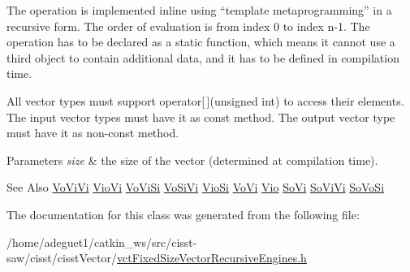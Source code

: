 The operation is implemented inline using ``template metaprogramming'' in a recursive form. The order of evaluation is from index 0 to index n-\/1. The operation has to be declared as a static function, which means it cannot use a third object to contain additional data, and it has to be defined in compilation time.

All vector types must support operator\mbox{[}$\,$\mbox{]}(unsigned int) to access their elements. The input vector types must have it as const method. The output vector type must have it as non-\/const method.


\begin{DoxyParams}{Parameters}
{\em size} & the size of the vector (determined at compilation time).\\
\hline
\end{DoxyParams}
\begin{DoxySeeAlso}{See Also}
\hyperlink{classvct_fixed_size_vector_recursive_engines_1_1_vo_vi_vi}{Vo\-Vi\-Vi} \hyperlink{classvct_fixed_size_vector_recursive_engines_1_1_vio_vi}{Vio\-Vi} \hyperlink{classvct_fixed_size_vector_recursive_engines_1_1_vo_vi_si}{Vo\-Vi\-Si} \hyperlink{classvct_fixed_size_vector_recursive_engines_1_1_vo_si_vi}{Vo\-Si\-Vi} \hyperlink{classvct_fixed_size_vector_recursive_engines_1_1_vio_si}{Vio\-Si} \hyperlink{classvct_fixed_size_vector_recursive_engines_1_1_vo_vi}{Vo\-Vi} \hyperlink{classvct_fixed_size_vector_recursive_engines_1_1_vio}{Vio} \hyperlink{classvct_fixed_size_vector_recursive_engines_1_1_so_vi}{So\-Vi} \hyperlink{classvct_fixed_size_vector_recursive_engines_1_1_so_vi_vi}{So\-Vi\-Vi} \hyperlink{classvct_fixed_size_vector_recursive_engines_1_1_so_vo_si}{So\-Vo\-Si} 
\end{DoxySeeAlso}


The documentation for this class was generated from the following file\-:\begin{DoxyCompactItemize}
\item 
/home/adeguet1/catkin\-\_\-ws/src/cisst-\/saw/cisst/cisst\-Vector/\hyperlink{vct_fixed_size_vector_recursive_engines_8h}{vct\-Fixed\-Size\-Vector\-Recursive\-Engines.\-h}\end{DoxyCompactItemize}
